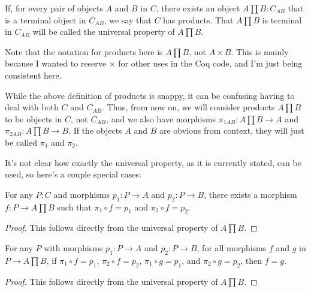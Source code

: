 \documentclass[../../math.tex]{subfiles}
\begin{document}
\begin{class}
    If, for every pair of objects $A$ and $B$ in $C$, there exists an object $A
    \prod B : C_{AB}$ that is a terminal object in $C_{AB}$, we say that $C$ has
    products.  That $A \prod B$ is terminal in $C_{AB}$ will be called the
    universal property of $A \prod B$.
\end{class}

Note that the notation for products here is $A \prod B$, not $A \times B$.  This
is mainly because I wanted to reserve $\times$ for other uses in the Coq code,
and I'm just being consistent here.

While the above definition of products is snappy, it can be confusing having to
deal with both $C$ and $C_{AB}$.  Thus, from now on, we will consider products
$A \prod B$ to be objects in $C$, not $C_{AB}$, and we also have morphisms
$\pi_{1AB} : A \prod B \to A$ and $\pi_{2AB} : A \prod B \to B$.  If the objects
$A$ and $B$ are obvious from context, they will just be called $\pi_1$ and
$\pi_2$.

It's not clear how exactly the universal property, as it is currently stated,
can be used, so here's a couple special cases:

\begin{theorem} \label{product_f} \label{product_f1} \label{product_f2}
    For any $P : C$ and morphisms $p_1 : P \to A$ and $p_2 : P \to B$, there
    exists a morphism $f : P \to A \prod B$ such that $\pi_1 \circ f = p_1$ and
    $\pi_2 \circ f = p_2$.
\end{theorem}
\begin{proof}
    This follows directly from the universal property of $A \prod B$.
\end{proof}

\begin{theorem} \label{product_f_uni} \label{product_f_uni2}
    For any $P$ with morphisms $p_1 : P \to A$ and $p_2 : P \to B$, for all
    morphisms $f$ and $g$ in $P \to A \prod B$, if $\pi_1 \circ f = p_1$, $\pi_2
    \circ f = p_2$, $\pi_1 \circ g = p_1$, and $\pi_2 \circ g = p_2$, then $f =
    g$.
\end{theorem}
\begin{proof}
    This follows directly from the universal property of $A \prod B$.
\end{proof}
\end{document}
